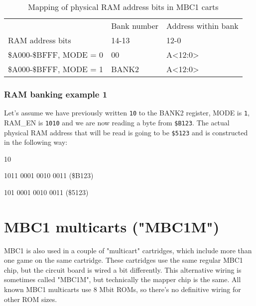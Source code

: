 \begin{table}[H]
  \caption{Mapping of physical RAM address bits in MBC1 carts}
  \ttfamily
  \begin{tabu} to \textwidth {|X[10,l]|X[5,c]|X[13,c]|}
    \everyrow{\hline}
    \hline
    \rowfont{\rmfamily}
    & Bank number & Address within bank \\
    \rowfont{\rmfamily}
    RAM address bits & 14-13 & 12-0 \\
    \$A000-\$BFFF, MODE = 0 & 00 & A<12:0> \\
    \$A000-\$BFFF, MODE = 1 & BANK2 & A<12:0> \\
    \hline
  \end{tabu}
\end{table}

\subsubsection{RAM banking example 1}

Let's assume we have previously written \texttt{10} to the BANK2 register, MODE
is \texttt{1}, RAM\_EN is \texttt{1010} and we are now reading a byte from
\texttt{\$B123}. The actual physical RAM address that will be read is going to
be \texttt{\$5123} and is constructed in the following way:

\begin{description}[leftmargin=15em,style=nextline]
  \item[Value of the BANK2 register]
  {
    \ttfamily
    \colorbox{red!30}{10}
  }
  \item[Address being read]
  {
    \ttfamily
    \colorbox{gray!10}{101}\colorbox{green!30}{1 0001 0010 0011} (\$B123)
  }
  \item[Actual physical RAM address]
  {
    \ttfamily
    \colorbox{red!30}{10}\colorbox{green!30}{1 0001 0010 0011} (\$5123)
  }
\end{description}

\section{MBC1 multicarts ("MBC1M")}

MBC1 is also used in a couple of "multicart" cartridges, which include more
than one game on the same cartridge. These cartridges use the same regular MBC1
chip, but the circuit board is wired a bit differently. This alternative wiring
is sometimes called "MBC1M", but technically the mapper chip is the same. All
known MBC1 multicarts use 8 Mbit ROMs, so there's no definitive wiring for
other ROM sizes.

